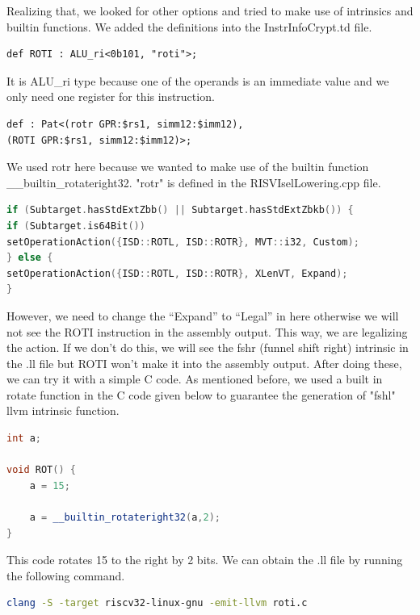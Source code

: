 Realizing that, we looked for other options and tried to make use of intrinsics and builtin functions. We added the definitions into the InstrInfoCrypt.td file.

\begin{lstlisting}
def ROTI : ALU_ri<0b101, "roti">;
\end{lstlisting}

It is ALU\_ri type because one of the operands is an immediate value and we only need one register for this instruction.

\begin{lstlisting}
def : Pat<(rotr GPR:$rs1, simm12:$imm12),
(ROTI GPR:$rs1, simm12:$imm12)>;
\end{lstlisting}

We used rotr here because we wanted to make use of the builtin function \_\_builtin\_rotateright32. "rotr" is defined in the RISVIselLowering.cpp file.

\begin{lstlisting}[language=C++]
if (Subtarget.hasStdExtZbb() || Subtarget.hasStdExtZbkb()) {
if (Subtarget.is64Bit())
setOperationAction({ISD::ROTL, ISD::ROTR}, MVT::i32, Custom);
} else {
setOperationAction({ISD::ROTL, ISD::ROTR}, XLenVT, Expand); 
}
\end{lstlisting}

However, we need to change the “Expand” to “Legal” in here otherwise we will not see the ROTI instruction in the assembly output.  This way, we are legalizing the action. If we don’t do this, we will see the fshr (funnel shift right) intrinsic in the .ll file but ROTI won’t make it into the assembly output. After doing these, we can try it with a simple C code. As mentioned before, we used a built in rotate function in the C code given below to guarantee the generation of "fshl" llvm intrinsic function. 

\begin{lstlisting}[language=C++]
int a;

void ROT() {
	a = 15;
	
	a = __builtin_rotateright32(a,2);	
}
\end{lstlisting}

This code rotates 15 to the right by 2 bits. We can obtain the .ll file by running the following command.

\begin{lstlisting}[language=Bash]
clang -S -target riscv32-linux-gnu -emit-llvm roti.c
\end{lstlisting}

